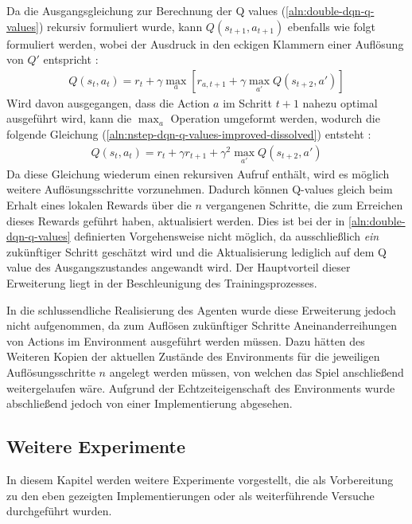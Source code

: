 \documentclass[11pt]{scrartcl}
\begin{document}
\newpage
Da die Ausgangsgleichung zur Berechnung der Q values (\ref{aln:double-dqn-q-values})
rekursiv formuliert wurde, kann $Q(s_{t+1}, a_{t+1})$ ebenfalls wie folgt formuliert
werden, wobei der Ausdruck in den eckigen Klammern einer Auflösung von $Q'$ entspricht
\cite[~S.168]{L2018}:
\begin{align}
Q(s_t, a_t) = r_t + \gamma \max_{a}[r_{a,t+1}+\gamma\max_{a'}Q(s_{t+2},a')]
\label{aln:nstep-dqn-q-values-improved}
\end{align}
Wird davon ausgegangen, dass die Action $a$ im Schritt $t+1$ nahezu optimal ausgeführt wird,
kann die $\max_{a}$ Operation umgeformt werden, wodurch die folgende Gleichung
(\ref{aln:nstep-dqn-q-values-improved-dissolved}) entsteht \cite[~S.168]{L2018}:
\begin{align}
Q(s_t, a_t) = r_t + \gamma r_{t+1}+\gamma^2 \max_{a'}Q(s_{t+2},a')
\label{aln:nstep-dqn-q-values-improved-dissolved}
\end{align}
Da diese Gleichung wiederum einen rekursiven Aufruf enthält, wird es möglich weitere
Auflösungsschritte vorzunehmen. Dadurch können Q-values gleich beim Erhalt eines lokalen
Rewards über die $n$ vergangenen Schritte, die zum Erreichen dieses Rewards geführt haben,
aktualisiert werden. Dies ist bei der in \autoref{aln:double-dqn-q-values} definierten
Vorgehensweise nicht möglich, da ausschließlich \textit{ein} zukünftiger Schritt geschätzt
wird und die Aktualisierung lediglich auf dem Q value des Ausgangszustandes angewandt wird. 
Der Hauptvorteil dieser Erweiterung liegt in der Beschleunigung des Trainingsprozesses.

In die schlussendliche Realisierung des Agenten wurde diese Erweiterung jedoch nicht
aufgenommen, da zum Auflösen zukünftiger Schritte Aneinanderreihungen von Actions im
Environment ausgeführt werden müssen. Dazu hätten des Weiteren Kopien der aktuellen
Zustände des Environments für die jeweiligen Auflösungsschritte $n$ angelegt werden
müssen, von welchen das Spiel anschließend weitergelaufen wäre. Aufgrund der
Echtzeiteigenschaft des Environments wurde abschließend jedoch von einer Implementierung
abgesehen.

\subsection{Weitere Experimente}
In diesem Kapitel werden weitere Experimente vorgestellt, die als Vorbereitung zu den eben
gezeigten Implementierungen oder als weiterführende Versuche durchgeführt wurden.
\end{document}
